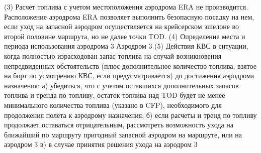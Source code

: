 (3) Расчет топлива с учетом местоположения аэродрома ERA не производится. Расположение аэродрома ERA позволяет выполнить безопасную посадку на нем, если уход на запасной аэродром осуществляется на крейсерском эшелоне во второй половине маршрута, но не далее точки TOD.
(4) Определение места и периода использования аэродрома 3%
Аэродром 3%
(5) Действия КВС в ситуации, когда полностью израсходован запас топлива на случай возникновения непредвиденных обстоятельств (плюс дополнительное количество топлива, взятое на борт по усмотрению КВС, если предусматривается) до достижения аэродрома назначения: 
а)	убедиться, что с учетом оставшихся дополнительных запасов топлива и тренда по топливу, остаток топлива над TOD будет не менее минимального количества топлива (указано в CFP), необходимого для продолжения полёта к аэродрому назначения; 
б)	если расчеты и тренд по топливу продолжает оставаться отрицательным, рассмотреть возможность ухода на ближайший по маршруту пригодный запасной аэродром на маршруте, или на аэродром 3%
в)	в случае принятия решения ухода на аэродром 3%
 
 

